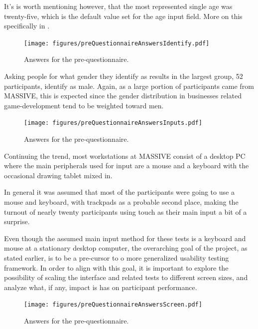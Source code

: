 \documentclass[nofilelist,dvipsnames]{cslthse-msc}
\begin{document}
        It's is worth mentioning however, that the most represented single age
        was twenty-five, which is the default value set for the age input
        field. More on this specifically in .

				\begin{figure}[h!]
					\centering
					\texttt{[image: figures/preQuestionnaireAnswersIdentify.pdf]}
					\caption{Answers for the pre-questionnaire.}
				\end{figure}

        Asking people for what gender they identify as results in the largest
        group, 52 participants, identify as male. Again, as a large portion of
        participants came from MASSIVE, this is expected since the gender
        distribution in businesses related game-development tend to be weighted
        toward men\findref\findref.

				\begin{figure}[h!]
					\centering
					\texttt{[image: figures/preQuestionnaireAnswersInputs.pdf]}
					\caption{Answers for the pre-questionnaire.}
				\end{figure}

        Continuing the trend, most workstations at MASSIVE consist of a
        desktop PC where the main peripherals used for input are a mouse and a
        keyboard with the occasional drawing tablet mixed in.

        In general it was assumed that most of the participants were going to
        use a mouse and keyboard, with trackpads as a probable second place,
        making the turnout of nearly twenty participants using touch as their
        main input a bit of a surprise.

        Even though the assumed main input method for these tests is a keyboard
        and mouse at a stationary desktop computer, the overarching goal of the
        project, as stated earlier, is to be a pre-cursor to o more generalized
        usability testing framework. In order to align with this goal, it is
        important to explore the possibility of scaling the interface and
        related tests to different screen sizes, and analyze what, if any,
        impact is has on participant performance.

				\begin{figure}[h!]
					\centering
					\texttt{[image: figures/preQuestionnaireAnswersScreen.pdf]}
					\caption{Answers for the pre-questionnaire.}
				\end{figure}
\end{document}
